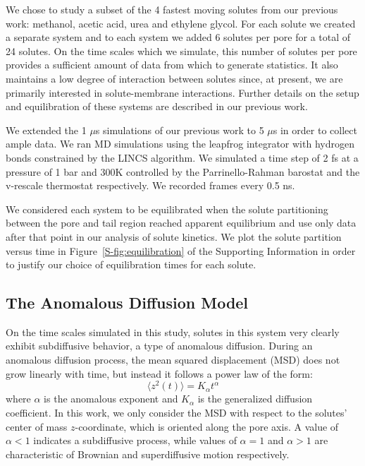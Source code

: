 \documentclass[journal=jctcce,manuscript=article]{achemso}
\begin{document}
  We chose to study a subset of the 4 fastest moving solutes from our previous
  work: methanol, acetic acid, urea and ethylene glycol. For each solute we 
  created a separate system and to each system we added 6 solutes per pore 
  for a total of 24 solutes. On the time scales which we simulate, this number
  of solutes per pore provides a sufficient amount of data from which to 
  generate statistics. It also maintains a low degree of interaction between
  solutes since, at present, we are primarily interested in solute-membrane 
  interactions. Further details on the setup and equilibration of these systems
  are described in our previous work.\cite{coscia_chemically_2019}
  
  We extended the 1 $\mu$s simulations of our previous work to 5 $\mu$s in order
  to collect ample data. We ran MD simulations using the leapfrog integrator with 
  hydrogen bonds constrained by the LINCS algorithm. We simulated a time step of 2 fs at
  a pressure of 1 bar and 300K controlled by the Parrinello-Rahman barostat and
  the v-rescale thermostat respectively. We recorded frames every 0.5 ns.
  
  We considered each system to be equilibrated when the solute partitioning between the 
  pore and tail region reached apparent equilibrium and use only data after that point
  in our analysis of solute kinetics. We plot the solute partition versus time in
  Figure~\ref{S-fig:equilibration} of the Supporting Information in order to justify
  our choice of equilibration times for each solute.

  \subsection{The Anomalous Diffusion Model}\label{method:model_sFBM}

  On the time scales simulated in this study, solutes in this system very 
  clearly exhibit subdiffusive behavior, a type of anomalous diffusion. 
  During an anomalous diffusion process, the mean squared displacement (MSD)
  does not grow linearly with time, but instead it follows a power law of 
  the form: 
  \begin{equation} 
  \langle z^2(t) \rangle = K_{\alpha}t^{\alpha}
  \label{eqn:msd_form}
  \end{equation} 
  where $\alpha$ is the anomalous exponent and $K_{\alpha}$ is the generalized 
  diffusion coefficient. In this work, we only consider the MSD with respect to
  the solutes' center of mass $z$-coordinate, which is oriented along the pore 
  axis. A value of $\alpha < 1$ indicates a subdiffusive process, while values
  of $\alpha = 1$ and $\alpha > 1$ are characteristic of Brownian and 
  superdiffusive motion respectively.
 
\end{document}
